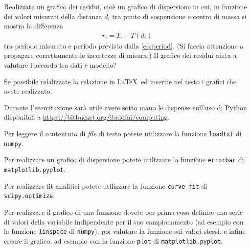 \documentclass{lab1-article}
\begin{document}
\begin{article}
Realizzate un grafico dei residui, cio\`e un grafico di dispersione in cui,
in funzione dei valori misurati della distanza $d_i$ tra punto di sospensione
e centro di massa si mostra la differenza
\begin{align}
  r_i = T_i - T(d_i)
\end{align}
tra periodo misurato e periodo previsto dalla \eqref{eq:period}. (Si faccia
attenzione a propagare correttamente le incertezze di misura.) Il grafico
dei residui aiuta a valutare l'accordo tra dati e modello?



Se possibile relalizzate la relazione in \LaTeX\ ed inserite nel testo
i grafici che avete realizzato.


\secconsiderations

Durante l'esercitazione sar\`a utile avere sotto mano le dispense sull'uso di
Python disponibili a \url{https://bitbucket.org/lbaldini/computing}.

Per leggere il contentuto di \emph{file} di testo potete utilizzare la
funzione \verb|loadtxt| di \verb|numpy|.

Per realizzare un grafico di dispersione potete utilizzare la funzione
\verb|errorbar| di \verb|matplotlib.pyplot|.

Per realizzare fit analitici potete utilizzare la funzione
\verb|curve_fit| di \verb|scipy.optimize|.

Per realizzare il grafico di una funzione dovete per prima cosa definire una
serie di valori della variabile indipendente per il suo campionamento
(ad esempio con la funzione \verb|linspace| di \verb|numpy|), poi valutare
la funzione sui valori stessi, e infine creare il grafico, ad esempio con
la funzione \verb|plot| di \verb|matplotlib.pyplot|.


\end{article}
\end{document}

